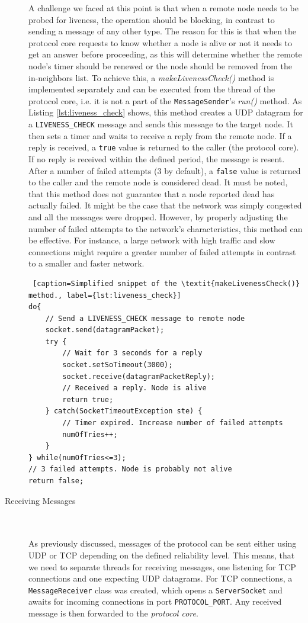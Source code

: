 \documentclass[a4paper,11pt,twoside]{report}
\newcommand{\classname}[1]{\texttt{#1}}
\begin{document}
\begin{description}
A challenge we faced at this point is that when a remote node needs to be probed for liveness, the operation should be blocking, in contrast to sending a message of any other type. The reason for this is that when the protocol core requests to know whether a node is alive or not it needs to get an answer before proceeding, as this will determine whether the remote node's timer should be renewed or the node should be removed from the in-neighbors list. To achieve this, a \textit{makeLivenessCheck()} method is implemented separately and can be executed from the thread of the protocol core, i.e. it is not a part of the \classname{MessageSender}'s \textit{run()} method. As Listing \ref{lst:liveness_check} shows, this method creates a UDP datagram for a \classname{LIVENESS\_CHECK} message and sends this message to the target node. It then sets a timer and waits to receive a reply from the remote node. If a reply is received, a \classname{true} value is returned to the caller (the protocol core). If no reply is received within the defined period, the message is resent. After a number of failed attempts (3 by default), a \classname{false} value is returned to the caller and the remote node is considered dead. It must be noted, that this method does not guarantee that a node reported dead has actually failed. It might be the case that the network was simply congested and all the messages were dropped. However, by properly adjusting the number of failed attempts to the network's characteristics, this method can be effective. For instance, a large network with high traffic and slow connections might require a greater number of failed attempts in contrast to a smaller and faster network.  


\begin{lstlisting} [caption=Simplified snippet of the \textit{makeLivenessCheck()} method., label={lst:liveness_check}]
do{
	// Send a LIVENESS_CHECK message to remote node
	socket.send(datagramPacket);
	try {
		// Wait for 3 seconds for a reply
		socket.setSoTimeout(3000);
		socket.receive(datagramPacketReply);
		// Received a reply. Node is alive
		return true;
	} catch(SocketTimeoutException ste) {
		// Timer expired. Increase number of failed attempts
		numOfTries++;
	}
} while(numOfTries<=3);
// 3 failed attempts. Node is probably not alive
return false;
\end{lstlisting}
\item[Receiving Messages] \hfill \\\\
As previously discussed, messages of the protocol can be sent either using UDP or TCP depending on the defined reliability level. This means, that we need to separate threads for receiving messages, one listening for TCP connections and one expecting UDP datagrams. For TCP connections, a \classname{MessageReceiver} class was created, which opens a \classname{ServerSocket} and awaits for incoming connections in port \classname{PROTOCOL\_PORT}. Any received message is then forwarded to the \textit{protocol core}. \\


\end{description}
\end{document}
